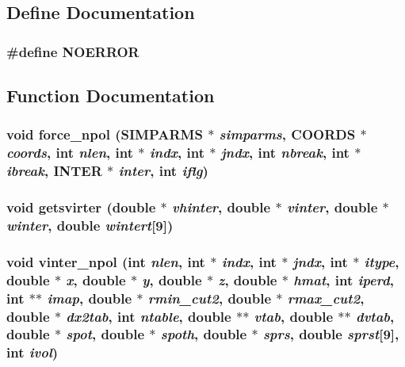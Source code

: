 \subsection{Define Documentation}
\subsubsection{\setlength{\rightskip}{0pt plus 5cm}\#define NOERROR}\label{md__fnopol_8c_7c8e007a5b28cfb6d606095153d7e764}




\subsection{Function Documentation}
\subsubsection{\setlength{\rightskip}{0pt plus 5cm}void force\_\-npol ({\bf SIMPARMS} $\ast$ {\em simparms}, {\bf COORDS} $\ast$ {\em coords}, int {\em nlen}, int $\ast$ {\em indx}, int $\ast$ {\em jndx}, int {\em nbreak}, int $\ast$ {\em ibreak}, {\bf INTER} $\ast$ {\em inter}, int {\em iflg})}\label{md__fnopol_8c_8ab253591d2a6885cd0e06b06aa42385}


\subsubsection{\setlength{\rightskip}{0pt plus 5cm}void getsvirter (double $\ast$ {\em vhinter}, double $\ast$ {\em vinter}, double $\ast$ {\em winter}, double {\em wintert}[9])}\label{md__fnopol_8c_be20f8ebec02caad8fe6a6394d9d1812}


\subsubsection{\setlength{\rightskip}{0pt plus 5cm}void vinter\_\-npol (int {\em nlen}, int $\ast$ {\em indx}, int $\ast$ {\em jndx}, int $\ast$ {\em itype}, double $\ast$ {\em x}, double $\ast$ {\em y}, double $\ast$ {\em z}, double $\ast$ {\em hmat}, int {\em iperd}, int $\ast$$\ast$ {\em imap}, double $\ast$ {\em rmin\_\-cut2}, double $\ast$ {\em rmax\_\-cut2}, double $\ast$ {\em dx2tab}, int {\em ntable}, double $\ast$$\ast$ {\em vtab}, double $\ast$$\ast$ {\em dvtab}, double $\ast$ {\em spot}, double $\ast$ {\em spoth}, double $\ast$ {\em sprs}, double {\em sprst}[9], int {\em ivol})}\label{md__fnopol_8c_9393e71b3c0dedc342a957272896eb88}


